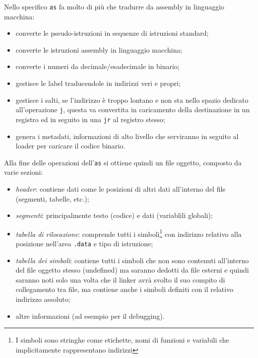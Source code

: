 \documentclass[class=book, crop=false, oneside]{standalone}
\begin{document}
Nello specifico \texttt{as} fa molto di più che tradurre da assembly in linguaggio macchina:
\begin{itemize}
	\item converte le pseudo-istruzioni in sequenze di istruzioni standard;
	\item converte le istruzioni assembly in linguaggio macchina;
	\item converte i numeri da decimale/esadecimale in binario;
	\item gestisce le label traducendole in indirizzi veri e propri;
	\item gestisce i salti, se l'indirizzo è troppo lontano e non sta nello spazio dedicato all'operazione \texttt{j}, questa va convertita in caricamento della destinazione in un registro ed in seguito in una \texttt{jr} al registro stesso;
	\item genera i metadati, informazioni di alto livello che serviranno in seguito al loader per caricare il codice binario.
\end{itemize}

Alla fine delle operazioni dell'\texttt{as} si ottiene quindi un file oggetto, composto da varie sezioni:
\begin{itemize}
	\item \emph{header}: contiene dati come le posizioni di altri dati all'interno del file (segmenti, tabelle, etc.);
	\item \emph{segmenti}: principalmente testo (codice) e dati (variablili globali);
	\item \emph{tabella di rilocazione}: comprende tutti i simboli\footnote{I simboli sono stringhe come etichette, nomi di funzioni e variabili che implicitamente rappresentano indirizzi} con indirizzo relativo alla posizione nell'area \texttt{.data} e tipo di istruzione;
	\item \emph{tabella dei simboli}: contiene tutti i simboli che non sono contenuti all'interno del file oggetto stesso (undefined) ma saranno dedotti da file esterni e quindi saranno noti solo una volta che il linker avrà svolto il suo compito di collegamento tra file, ma contiene anche i simboli definiti con il relativo indirizzo assoluto;
	\item altre informazioni (ad esempio per il debugging).
\end{itemize}
\end{document}
